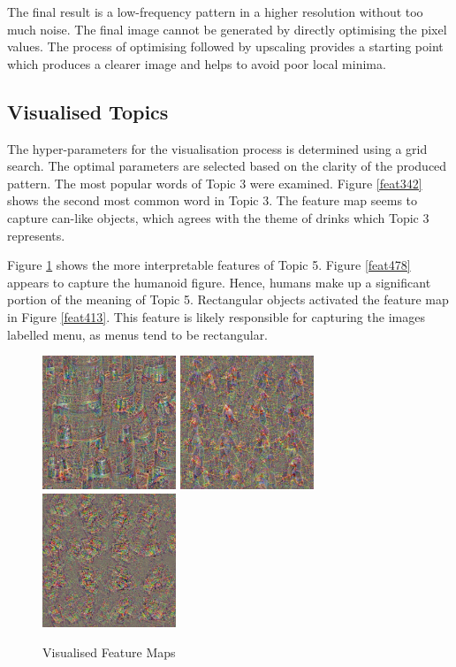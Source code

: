 \documentclass{article}
\begin{document}
The final result is a low-frequency pattern in a higher resolution without too much noise. The final image cannot be generated by directly optimising the pixel values. The process of optimising followed by upscaling provides a starting point which produces a clearer image and helps to avoid poor local minima. 

\subsection{Visualised Topics}
The hyper-parameters for the visualisation process is determined using a grid search. The optimal parameters are selected based on the clarity of the produced pattern. The most popular words of Topic 3 were examined. Figure \ref{feat342} shows the second most common word in Topic 3. The feature map seems to capture can-like objects, which agrees with the theme of drinks which Topic 3 represents.

Figure \ref{img:Topic5feat} shows the more interpretable features of Topic 5. Figure \ref{feat478} appears to capture the humanoid figure. Hence, humans make up a significant portion of the meaning of Topic 5. Rectangular objects activated the feature map in Figure \ref{feat413}. This feature is likely responsible for capturing the images labelled menu, as menus tend to be rectangular.

\begin{figure}[h]
\centering
{}
{%
    \includegraphics[width=4cm]{342.jpg}
    \hspace{0.04\columnwidth}
}%
{%
    \includegraphics[width=4cm]{478.jpg}
    \hspace{0.04\columnwidth}
}%
{%
    \includegraphics[width=4cm]{413.jpg}
    \hspace*{\fill}
}%
\caption{Visualised Feature Maps} \label{img:Topic5feat}
\end{figure}
\end{document}
